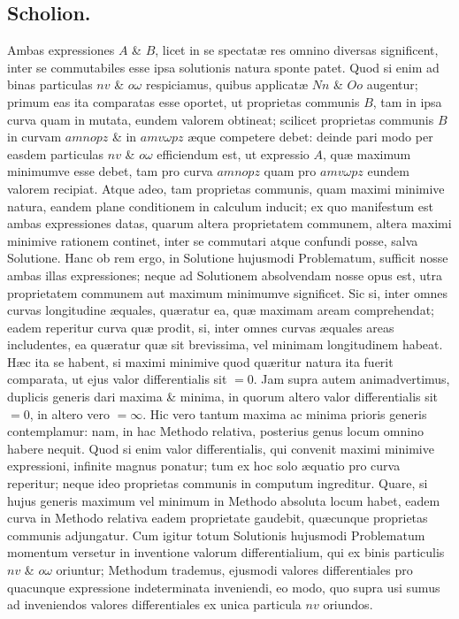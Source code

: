 \subsection*{Scholion.}
Ambas expressiones $A$ \& $B$, licet in se spectatæ res omnino diversas significent, inter se commutabiles esse ipsa solutionis natura sponte patet. Quod si enim ad binas particulas $nv$ \& $o\omega$ respiciamus, quibus applicatæ $Nn$ \& $Oo$ augentur; primum eas ita comparatas esse oportet, ut proprietas communis $B$, tam in ipsa curva quam in mutata, eundem valorem obtineat; scilicet proprietas communis $B$ in curvam $amnopz$ \& in $amv\omega pz$ æque competere debet: deinde pari modo per easdem particulas $nv$ \& $o\omega$ efficiendum est, ut expressio $A$, quæ maximum minimumve esse debet, tam pro curva $amnopz$ quam pro $amv\omega pz$ eundem valorem recipiat. Atque adeo, tam proprietas communis, quam maximi minimive natura, eandem plane conditionem in calculum inducit; ex quo manifestum est ambas expressiones datas, quarum altera proprietatem communem, altera maximi minimive rationem continet, inter se commutari atque confundi posse, salva Solutione. Hanc ob rem ergo, in Solutione hujusmodi Problematum, sufficit nosse ambas illas expressiones; neque ad Solutionem absolvendam nosse opus est, utra proprietatem communem aut maximum minimumve significet. Sic si, inter omnes curvas longitudine æquales, quæratur ea, quæ maximam aream comprehendat; eadem reperitur curva quæ prodit, si, inter omnes curvas æquales areas includentes, ea quæratur quæ sit brevissima, vel minimam longitudinem habeat. Hæc ita se habent, si maximi minimive quod quæritur natura ita fuerit comparata, ut ejus valor differentialis sit $=0$. Jam supra autem animadvertimus, duplicis generis dari maxima \& minima, in quorum altero valor differentialis sit $=0$, in altero vero $=\infty$. Hic vero tantum maxima ac minima prioris generis contemplamur: nam, in hac Methodo relativa, posterius genus locum omnino habere nequit. Quod si enim valor differentialis, qui convenit maximi minimive expressioni, infinite magnus ponatur; tum ex hoc solo æquatio pro curva reperitur; neque ideo proprietas communis in computum ingreditur. Quare, si hujus
generis maximum vel minimum in Methodo absoluta locum habet, eadem curva in Methodo relativa eadem proprietate gaudebit, quæcunque proprietas communis adjungatur. Cum igitur totum Solutionis hujusmodi Problematum momentum versetur in inventione valorum differentialium, qui ex binis particulis $nv$ \& $o\omega$ oriuntur; Methodum trademus, ejusmodi valores differentiales pro quacunque expressione indeterminata inveniendi, eo modo, quo supra usi sumus ad inveniendos valores differentiales ex unica particula $nv$ oriundos.

